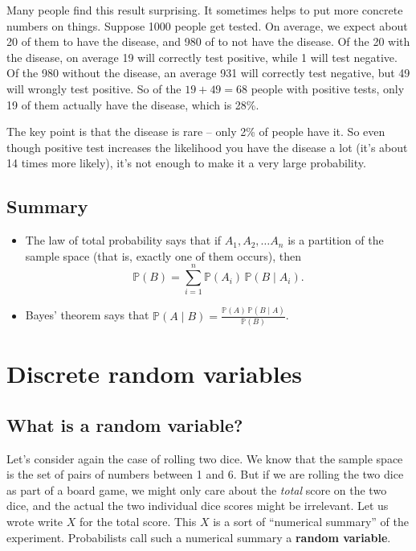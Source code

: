 \documentclass[
  a4paper,
]{book}
\providecommand{\tightlist}{%
  \setlength{\itemsep}{0pt}\setlength{\parskip}{0pt}}
\theoremstyle{definition}
\theoremstyle{definition}
\theoremstyle{definition}
\theoremstyle{definition}
\theoremstyle{remark}
\begin{document}
Many people find this result surprising. It sometimes helps to put more concrete numbers on things. Suppose 1000 people get tested. On average, we expect about 20 of them to have the disease, and 980 of to not have the disease. Of the 20 with the disease, on average 19 will correctly test positive, while 1 will test negative. Of the 980 without the disease, an average 931 will correctly test negative, but 49 will wrongly test positive. So of the \(19+49 = 68\) people with positive tests, only 19 of them actually have the disease, which is 28\%.

The key point is that the disease is rare -- only 2\% of people have it. So even though positive test increases the likelihood you have the disease a lot (it's about 14 times more likely), it's not enough to make it a very large probability.

\hypertarget{summary-L08}{%
\section*{Summary}\label{summary-L08}}

\begin{itemize}
\tightlist
\item
  The law of total probability says that if \(A_1, A_2, \dots A_n\) is a partition of the sample space (that is, exactly one of them occurs), then
  \[ \mathbb P(B) = \sum_{i=1}^n \mathbb P(A_i) \, \mathbb P(B \mid A_i) . \]
\item
  Bayes' theorem says that \({\displaystyle \mathbb P(A \mid B) = \frac{\mathbb P(A) \,\mathbb P(B \mid A)}{\mathbb P(B)} }\).
\end{itemize}

\hypertarget{L09-discrete-rv}{%
\chapter{Discrete random variables}\label{L09-discrete-rv}}

\hypertarget{rv}{%
\section{What is a random variable?}\label{rv}}

Let's consider again the case of rolling two dice. We know that the sample space is the set of pairs of numbers between 1 and 6.
But if we are rolling the two dice as part of a board game, we might only care about the \emph{total} score on the two dice, and the actual the two individual dice scores might be irrelevant. Let us wrote write \(X\) for the total score. This \(X\) is a sort of ``numerical summary'' of the experiment. Probabilists call such a numerical summary a \textbf{random variable}.
\end{document}

